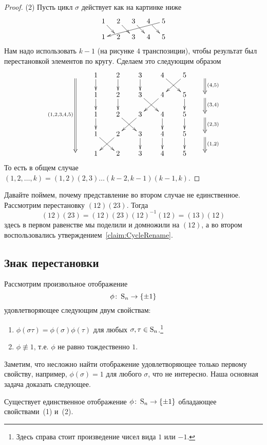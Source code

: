 \begin{proof}
(2) Пусть цикл $\sigma$ действует как на картинке ниже
\[
\xymatrix@R=10pt@C=10pt{
  {1}\ar[dr]&{2}\ar[dr]&{3}\ar[dr]&{4}\ar[dr]&{5}\ar[dllll]\\
  {1}&{2}&{3}&{4}&{5}\\
}
\]
Нам надо использовать $k-1$ (на рисунке $4$ транспозиции), чтобы результат был перестановкой элементов по кругу. Сделаем это следующим образом
\[
\xymatrix@R=15pt@C=20pt{
  {}\ar@{=>}_{(1,2,3,4,5)}[dddd]&{1}\ar[d]&{2}\ar[d]&{3}\ar[d]&{4}\ar[dr]&{5}\ar[dl]&{}\ar@{=>}[d]^{(4,5)}\\
  {}&{1}\ar[d]&{2}\ar[d]&{3}\ar[dr]&{4}\ar[dl]&{5}\ar[d]&{}\ar@{=>}[d]^{(3,4)}\\
  {}&{1}\ar[d]&{2}\ar[dr]&{3}\ar[dl]&{4}\ar[d]&{5}\ar[d]&{}\ar@{=>}[d]^{(2,3)}\\
  {}&{1}\ar[dr]&{2}\ar[dl]&{3}\ar[d]&{4}\ar[d]&{5}\ar[d]&{}\ar@{=>}[d]^{(1,2)}\\
  {}&{1}&{2}&{3}&{4}&{5}&{}\\
}
\]
То есть в общем случае $(1,2,\ldots,k) = (1,2)(2,3)\ldots(k-2,k-1)(k-1,k)$.

\end{proof}

Давайте поймем, почему представление во втором случае не единственное. Рассмотрим перестановку $(12)(23)$. Тогда
\[
(12)(23) = (12)(23)(12)^{-1}(12) = (13)(12)
\]
здесь в первом равенстве мы поделили и домножили на $(12)$, а во втором воспользовались утверждением~\ref{claim:CycleRename}.


\subsection{Знак перестановки}

Рассмотрим произвольное отображение 
\[
\phi\colon \operatorname{S}_{n}\to \{\pm 1\}
\]
удовлетворяющее следующим двум свойствам:
\begin{enumerate}
\item $\phi(\sigma \tau) = \phi(\sigma)\phi(\tau)$ для любых $\sigma, \tau \in\operatorname{S}_{n}$.\footnote{Здесь справа стоит произведение чисел вида $1$ или $-1$.}

\item $\phi\not\equiv 1$, т.е. $\phi$ не равно тождественно $1$.
\end{enumerate}
Заметим, что несложно найти отображение удовлетворяющее только первому свойству, например, $\phi(\sigma) = 1$ для любого $\sigma$, что не интересно. Наша основная задача доказать следующее.

\begin{claim}
Существует единственное отображение $\phi\colon \operatorname{S}_{n} \to \{\pm 1\}$ обладающее свойствами~(1) и~(2).
\end{claim}

